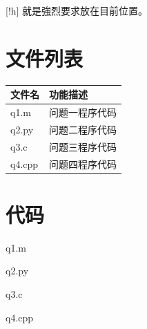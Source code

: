 \documentclass[withoutpreface,bwprint]{NoteBook}
\begin{document}
[!h] 就是強烈要求放在目前位置。


\nocite{*}

\newpage
\begin{appendices}
\section{文件列表}
\begin{table}[H]
\centering
\begin{tabularx}{\textwidth}{LL}
\toprule
文件名   & 功能描述 \\
\midrule
q1.m & 问题一程序代码 \\
q2.py & 问题二程序代码 \\
q3.c & 问题三程序代码 \\
q4.cpp & 问题四程序代码 \\
\bottomrule
\end{tabularx}
\label{tab:文件列表}
\end{table}

\section{代码}
\noindent q1.m

q2.py

q3.c

q4.cpp

\end{appendices}
\end{document}

